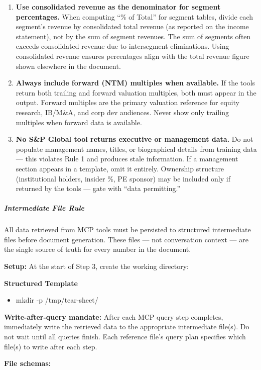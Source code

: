 \documentclass[11pt]{article}
\begin{document}
\begin{enumerate}[leftmargin=*,itemsep=2pt,topsep=2pt]
\item {} \textbf{Use consolidated revenue as the denominator for segment percentages.} When computing ``\% of Total'' for segment tables, divide each segment's revenue by consolidated total revenue (as reported on the income statement), not by the sum of segment revenues. The sum of segments often exceeds consolidated revenue due to intersegment eliminations. Using consolidated revenue ensures percentages align with the total revenue figure shown elsewhere in the document.
\item {} \textbf{Always include forward (NTM) multiples when available.} If the tools return both trailing and forward valuation multiples, both must appear in the output. Forward multiples are the primary valuation reference for equity research, IB/M\&A, and corp dev audiences. Never show only trailing multiples when forward data is available.
\item {} \textbf{No S\&P Global tool returns executive or management data.} Do not populate management names, titles, or biographical details from training data — this violates Rule 1 and produces stale information. If a management section appears in a template, omit it entirely. Ownership structure (institutional holders, insider \%, PE sponsor) may be included only if returned by the tools — gate with ``data permitting.''
\end{enumerate}

\subparagraph{Intermediate File Rule}\mbox{}\par

All data retrieved from MCP tools must be persisted to structured intermediate files before document generation. These files — not conversation context — are the single source of truth for every number in the document.


\textbf{Setup:} At the start of Step 3, create the working directory:

\textbf{Structured Template}
\begin{itemize}[leftmargin=*,itemsep=2pt,topsep=2pt]
\item {} mkdir -p /tmp/tear-sheet/
\end{itemize}

\textbf{Write-after-query mandate:} After each MCP query step completes, immediately write the retrieved data to the appropriate intermediate file(s). Do not wait until all queries finish. Each reference file's query plan specifies which file(s) to write after each step.


\textbf{File schemas:}
\end{document}
